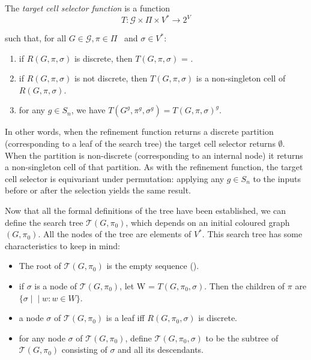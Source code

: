 \vspace{0.5em}
\begin{definition}\label{def: target cell function}
  The \emph{target cell selector function} is a function  
  \[
  T : \mathcal{G} \times \Pi \times V^* \to 2^V
  \]
  
  such that, for all  $G \mathrel{\in}\mathcal{G},  \pi\mathrel{\in}\Pi$ \ and  $\sigma\mathrel{\in}V^*$:
  
  \begin{enumerate}[label=\textit{T\arabic*.}]
      \item if $R (G, \pi, \sigma)$ is discrete, then $T  (G, \pi, \sigma)$ = .
      \item if $R (G, \pi, \sigma)$ is not discrete, then $T (G, \pi,\sigma)$ is a non-singleton cell of $R (G, \pi, \sigma)$.
     \item for any $g \mathrel{\in}S_n$, we have $T (G^g, \pi^g, \sigma^g) = T {(G, \pi, \sigma)}^g$.
  \end{enumerate}
  \end{definition}

  In other words, when the refinement function returns a discrete partition (corresponding to a leaf of the search tree) the target cell selector returns $\emptyset$. When the partition is non-discrete  (corresponding to an internal node) it returns a non-singleton cell of that partition. As with the refinement function, the target cell selector is equivariant under permutation: applying any $g \in S_n$ to the inputs before or after the selection yields the same result.

Now that all the formal definitions of the tree have been established, we can define the search tree $\mathcal{T} (G, \pi_0)$, which depends on an initial coloured graph $ (G, \pi_0)$. All the nodes of the tree are elements of $V^*$. This search tree has some characteristics to keep in mind:

\begin{itemize}
    \item The root of $\mathcal{T} (G, \pi_0)$ is the empty sequence ().
    \item if $\sigma$ is a node of $\mathcal{T} (G, \pi_0)$, let W = $T (G, \pi_0, \sigma)$. Then the children of $\pi$ are 
    \\ $\{\sigma\mathrel{\mid}\mathrel{\mid} w: w\mathrel{\in}W\}$.
    \item a node $\sigma$ of $\mathcal{T} (G, \pi_0)$ is a leaf iff $R (G, \pi_0, \sigma)$ is discrete.
    \item for any node $\sigma$ of $\mathcal{T} (G, \pi_0)$, define $\mathcal{T} (G, \pi_0, \sigma)$ to be the subtree of $\mathcal{T} (G, \pi_0)$ consisting of $\sigma$ and all its descendants.
    
\end{itemize}



